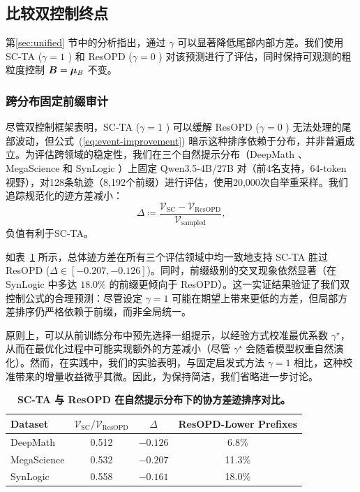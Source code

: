 \subsection{比较双控制终点}
\label{sec:control-comparison}

第\ref{sec:unified} 节中的分析指出，通过 $\gamma$ 可以显著降低尾部内部方差。我们使用 SC-TA ($\gamma=1$ ) 和 ResOPD ($\gamma=0$ ) 对该预测进行了评估，同时保持可观测的粗粒度控制 $\bm B=\bm{\mu}_B$ 不变。

\subsubsection{跨分布固定前缀审计}
尽管双控制框架表明，SC-TA ($\gamma=1$ ) 可以缓解 ResOPD ($\gamma=0$ ) 无法处理的尾部波动，但公式~(\ref{eq:event-improvement}) 暗示这种排序依赖于分布，并非普遍成立。为评估跨领域的稳定性，我们在三个自然提示分布（DeepMath \citep{deepmath}、MegaScience \citep{fan2025megascience} 和 SynLogic \citep{liu2026synlogic}）上固定 Qwen3.5-4B/27B 对（前4名支持，64-token 视野），对128条轨迹（8,192个前缀）进行评估，使用20,000次自举重采样。我们追踪规范化的迹方差减小：
\begin{equation}
  \Delta \coloneqq \frac{\mathcal{V}_{\mathrm{SC}} - \mathcal{V}_{\mathrm{ResOPD}}}{\mathcal{V}_{\mathrm{sampled}}},
\end{equation}
负值有利于SC-TA。

如表~\ref{tab:scta-cross-distribution} 所示，总体迹方差在所有三个评估领域中均一致地支持 SC-TA 胜过 ResOPD ($\Delta \in [-0.207, -0.126]$)。同时，前缀级别的交叉现象依然显著（在 SynLogic 中多达 $18.0\%$ 的前缀更倾向于 ResOPD）。这一实证结果验证了我们双控制公式的合理预测：尽管设定 $\gamma=1$ 可能在期望上带来更低的方差，但局部方差排序仍严格依赖于前缀，而非全局统一。

原则上，可以从前训练分布中预先选择一组提示，以经验方式校准最优系数 $\gamma^\star$，从而在最优化过程中可能实现额外的方差减小（尽管 $\gamma^\star$ 会随着模型权重自然演化）。然而，在实践中，我们的实验表明，与固定启发式方法 $\gamma=1$ 相比，这种校准带来的增量收益微乎其微。因此，为保持简洁，我们省略进一步讨论。

\begin{table}[t]
\caption{\textbf{SC-TA 与 ResOPD 在自然提示分布下的协方差迹排序对比。}}
\vspace{-2mm}
\label{tab:scta-cross-distribution}
\centering
\small
\setlength{\tabcolsep}{6.0pt}
\begin{tabular}{@{}lccc@{}}
\toprule
Dataset & $\mathcal{V}_{\mathrm{SC}} / \mathcal{V}_{\mathrm{ResOPD}}$ & $\Delta$ & ResOPD-Lower Prefixes \\
\midrule
DeepMath    & 0.512 & $-0.126$ & \phantom{0}6.8\% \\
MegaScience & 0.532 & $-0.207$ & 11.3\% \\
SynLogic    & 0.558 & $-0.161$ & 18.0\% \\
\bottomrule
\end{tabular}
\vspace{-2mm}
\end{table}

